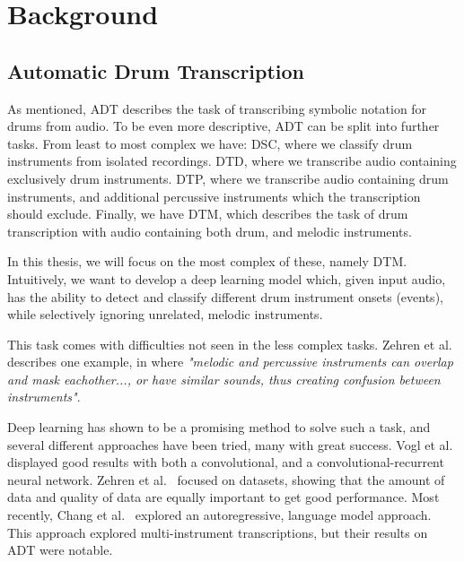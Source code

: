 \chapter{Background}

\section{Automatic Drum Transcription}

As mentioned, \gls{ADT} describes the task of transcribing symbolic notation for drums from audio. To be even more descriptive, \gls{ADT} can be split into further tasks. From least to most complex we have: \gls{DSC}, where we classify drum instruments from isolated recordings. \gls{DTD}, where we transcribe audio containing exclusively drum instruments. \gls{DTP}, where we transcribe audio containing drum instruments, and additional percussive instruments which the transcription should exclude. Finally, we have \gls{DTM}, which describes the task of drum transcription with audio containing both drum, and melodic instruments.~\cite{8350302}

In this thesis, we will focus on the most complex of these, namely \gls{DTM}. Intuitively, we want to develop a deep learning model which, given input audio, has the ability to detect and classify different drum instrument onsets (events), while selectively ignoring unrelated, melodic instruments.

This task comes with difficulties not seen in the less complex tasks. Zehren et al.~\cite{signals4040042} describes one example, in where \textit{"melodic and percussive instruments can overlap and mask eachother..., or have similar sounds, thus creating confusion between instruments"}.

Deep learning has shown to be a promising method to solve such a task, and several different approaches have been tried, many with great success. Vogl et al.~\cite{vogl2018multiinstrumentdrumtranscription, Vogl2017DrumTV} displayed good results with both a convolutional, and a convolutional-recurrent neural network. Zehren et al.~\cite{signals4040042, zehren2024analyzingreducingsynthetictorealtransfer} focused on datasets, showing that the amount of data and quality of data are equally important to get good performance. Most recently, Chang et al.~\cite{chang2024yourmt3multiinstrumentmusictranscription} explored an autoregressive, language model approach. This approach explored multi-instrument transcriptions, but their results on \gls{ADT} were notable.

